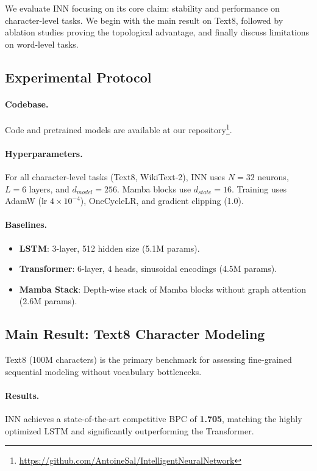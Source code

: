 \documentclass{article}
\begin{document}
We evaluate INN focusing on its core claim: stability and performance on character-level tasks. We begin with the main result on Text8, followed by ablation studies proving the topological advantage, and finally discuss limitations on word-level tasks.

\subsection{Experimental Protocol}

\paragraph{Codebase.} Code and pretrained models are available at our repository\footnote{\url{https://github.com/AntoineSal/IntelligentNeuralNetwork}}.
\paragraph{Hyperparameters.} For all character-level tasks (Text8, WikiText-2), INN uses $N=32$ neurons, $L=6$ layers, and $d_{model}=256$. Mamba blocks use $d_{state}=16$. Training uses AdamW (lr $4 \times 10^{-4}$), OneCycleLR, and gradient clipping (1.0).
\paragraph{Baselines.}
\begin{itemize}
    \item \textbf{LSTM}: 3-layer, 512 hidden size (5.1M params).
    \item \textbf{Transformer}: 6-layer, 4 heads, sinusoidal encodings (4.5M params).
    \item \textbf{Mamba Stack}: Depth-wise stack of Mamba blocks without graph attention (2.6M params).
\end{itemize}

\subsection{Main Result: Text8 Character Modeling}

Text8 (100M characters) is the primary benchmark for assessing fine-grained sequential modeling without vocabulary bottlenecks.

\paragraph{Results.} INN achieves a state-of-the-art competitive BPC of \textbf{1.705}, matching the highly optimized LSTM and significantly outperforming the Transformer.
\end{document}
